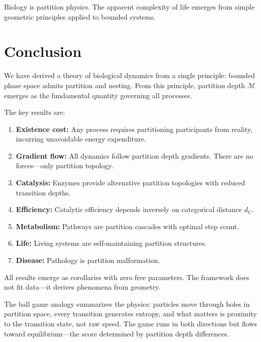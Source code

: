 \documentclass[twocolumn,10pt,a4paper]{article}
\theoremstyle{definition}
\theoremstyle{remark}
\newcommand{\Depth}{\mathcal{M}}
\newcommand{\dC}{d_{\mathrm{C}}}
\begin{document}
Biology is partition physics. The apparent complexity of life emerges from simple geometric principles applied to bounded systems.

\section{Conclusion}
\label{sec:conclusion}

We have derived a theory of biological dynamics from a single principle: bounded phase space admits partition and nesting. From this principle, partition depth $\Depth$ emerges as the fundamental quantity governing all processes.

The key results are:

\begin{enumerate}
    \item \textbf{Existence cost:} Any process requires partitioning participants from reality, incurring unavoidable energy expenditure.

    \item \textbf{Gradient flow:} All dynamics follow partition depth gradients. There are no forces---only partition topology.

    \item \textbf{Catalysis:} Enzymes provide alternative partition topologies with reduced transition depths.

    \item \textbf{Efficiency:} Catalytic efficiency depends inversely on categorical distance $\dC$.

    \item \textbf{Metabolism:} Pathways are partition cascades with optimal step count.

    \item \textbf{Life:} Living systems are self-maintaining partition structures.

    \item \textbf{Disease:} Pathology is partition malformation.
\end{enumerate}

All results emerge as corollaries with zero free parameters. The framework does not fit data---it derives phenomena from geometry.

The ball game analogy summarizes the physics: particles move through holes in partition space, every transition generates entropy, and what matters is proximity to the transition state, not raw speed. The game runs in both directions but flows toward equilibrium---the score determined by partition depth differences.
\end{document}
